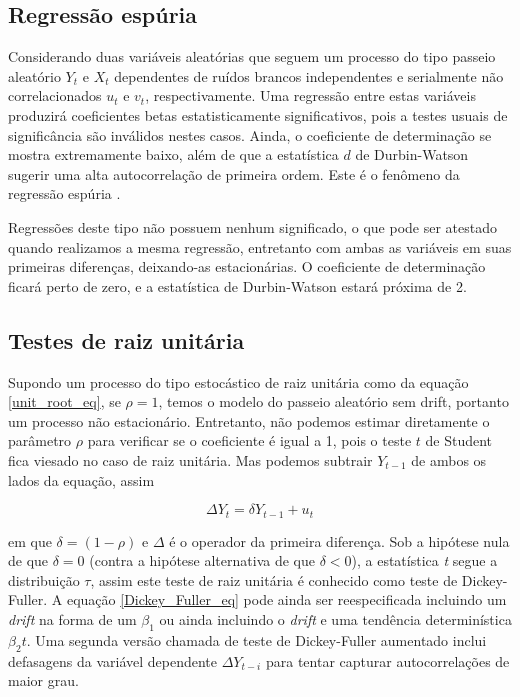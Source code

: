 \documentclass[twocolumn]{rbef}
\newcommand{\1}{\mathbbm{1}}
\begin{document}
\subsection{Regressão espúria} \label{spurious}

Considerando duas variáveis aleatórias que seguem um processo do tipo passeio aleatório $Y_{t}$ e $X_{t}$ dependentes de ruídos brancos independentes e serialmente não correlacionados $u_{t}$ e $v_{t}$, respectivamente. Uma regressão entre estas variáveis produzirá coeficientes betas estatisticamente significativos, pois a testes usuais de significância são inválidos nestes casos\cite{Granger-Newbold}. Ainda, o coeficiente de determinação se mostra extremamente baixo, além de que a estatística $d$ de Durbin-Watson sugerir uma alta autocorrelação de primeira ordem\cite{Greene}. Este é o fenômeno da regressão espúria \cite{Yule}.

Regressões deste tipo não possuem nenhum significado, o que pode ser atestado quando realizamos a mesma regressão, entretanto com ambas as variáveis em suas primeiras diferenças, deixando-as estacionárias. O coeficiente de determinação ficará perto de zero, e a estatística de Durbin-Watson estará próxima de 2.

\subsection{Testes de raiz unitária} \label{unit_root}

Supondo um processo do tipo estocástico de raiz unitária como da equação \ref{unit_root_eq}, se $\rho = 1$, temos o modelo do passeio aleatório sem drift, portanto um processo não estacionário. Entretanto, não podemos estimar diretamente o parâmetro $\rho$ para verificar se o coeficiente é igual a 1, pois o teste $t$ de Student fica viesado no caso de raiz unitária. Mas podemos subtrair $Y_{t-1}$ de ambos os lados da equação, assim

\begin{equation} \label{Dickey_Fuller_eq}
    \Delta Y_{t} = \delta Y_{t-1} + u_{t}
\end{equation}

em que $\delta = (1-\rho)$ e $\Delta$ é o operador da primeira diferença. Sob a hipótese nula de que $\delta = 0$ (contra a hipótese alternativa de que $\delta < 0$), a estatística \textit{t} segue a distribuição $\tau$\cite{Dicker-Fuller}, assim este teste de raiz unitária é conhecido como teste de Dickey-Fuller. A equação \ref{Dickey_Fuller_eq} pode ainda ser reespecificada incluindo um \textit{drift} na forma de um $\beta_{1}$ ou ainda incluindo o \textit{drift} e uma tendência determinística $\beta_{2}t$. Uma segunda versão chamada de teste de Dickey-Fuller aumentado inclui defasagens da variável dependente $\Delta Y_{t-i}$ para tentar capturar autocorrelações de maior grau.
\end{document}
